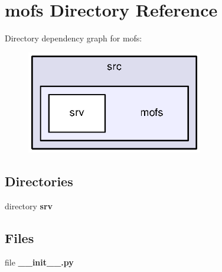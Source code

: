 \section{mofs Directory Reference}
\label{dir_571db4f79ea998f1613b516b324885db}
Directory dependency graph for mofs\-:\nopagebreak
\begin{figure}[H]
\begin{center}
\leavevmode
\includegraphics[width=218pt]{dir_571db4f79ea998f1613b516b324885db_dep}
\end{center}
\end{figure}
\subsection*{Directories}
\begin{DoxyCompactItemize}
\item 
directory {\bf srv}
\end{DoxyCompactItemize}
\subsection*{Files}
\begin{DoxyCompactItemize}
\item 
file {\bf \-\_\-\-\_\-init\-\_\-\-\_\-.\-py}
\end{DoxyCompactItemize}
